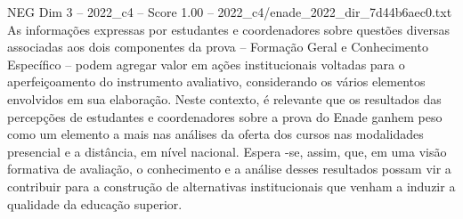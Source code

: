 \begin{textsample}{NEG Dim 3 – 2022\_c4 – Score 1.00 – 2022\_c4/enade\_2022\_dir\_7d44b6aec0.txt}
As informações expressas por estudantes e coordenadores sobre questões diversas associadas aos dois componentes da prova – Formação Geral e Conhecimento Específico – podem agregar valor em ações institucionais voltadas para o aperfeiçoamento do instrumento avaliativo, considerando os vários elementos envolvidos em sua elaboração.
Neste contexto, é relevante que os resultados das percepções de estudantes e coordenadores sobre a prova do Enade ganhem peso como um elemento a mais nas análises da oferta dos cursos nas modalidades presencial e a distância, em nível nacional.
Espera -se, assim, que, em uma visão formativa de avaliação, o conhecimento e a análise desses resultados possam vir a contribuir para a construção de alternativas institucionais que venham a induzir a qualidade da educação superior.

\end{textsample}
